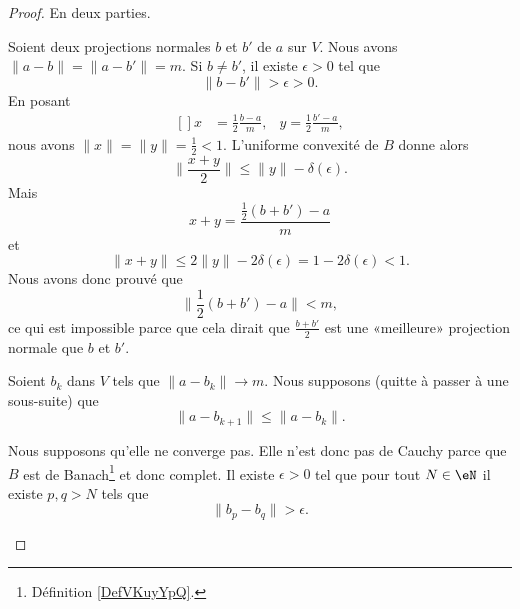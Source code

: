 \begin{proof}
	En deux parties.
	\begin{subproof}
		\spitem[Unicité]
		Soient deux projections normales \( b\) et \( b'\) de \( a\) sur \( V\). Nous avons \( \| a-b \|=\| a-b' \|=m\). Si \( b\neq b'\), il existe \( \epsilon>0\) tel que
		\begin{equation}
			\| b-b' \|>\epsilon>0.
		\end{equation}
		En posant
		\begin{equation}
			\begin{aligned}[]
				x & =\frac{ 1 }{2}\frac{ b-a }{ m }, & y=\frac{ 1 }{2}\frac{ b'-a }{ m },
			\end{aligned}
		\end{equation}
		nous avons \( \| x \|=\| y \|=\frac{ 1 }{2}<1\). L'uniforme convexité de \( B\) donne alors
		\begin{equation}
			\| \frac{ x+y }{2} \|\leq \| y \|-\delta(\epsilon).
		\end{equation}
		Mais
		\begin{equation}
			x+y=\frac{ \frac{ 1 }{2}(b+b')-a }{ m }
		\end{equation}
		et
		\begin{equation}
			\| x+y \|\leq 2\| y \|-2\delta(\epsilon)=1-2\delta(\epsilon)<1.
		\end{equation}
		Nous avons donc prouvé que
		\begin{equation}
			\| \frac{ 1 }{2}(b+b')-a \|<m,
		\end{equation}
		ce qui est impossible parce que cela dirait que \( \frac{ b+b' }{2}\) est une «meilleure» projection normale que \( b\) et \( b'\).

		\spitem[Existence]
		Soient \( b_k\) dans \( V\) tels que \( \| a-b_k \|\to m\). Nous supposons (quitte à passer à une sous-suite) que
		\begin{equation}
			\| a-b_{k+1} \|\leq \| a-b_k \|.
		\end{equation}

		\begin{subproof}

			Nous supposons qu'elle ne converge pas. Elle n'est donc pas de Cauchy parce que \( B\) est de Banach\footnote{Définition \ref{DefVKuyYpQ}.} et donc complet. Il existe \( \epsilon>0\) tel que pour tout \( N\in \eN\) il existe \( p,q>N\) tels que
			\begin{equation}
				\| b_p-b_q \|>\epsilon.
			\end{equation}


\end{subproof}
\end{subproof}
\end{proof}
